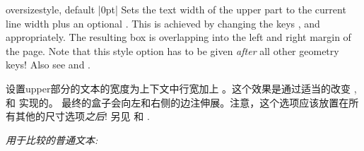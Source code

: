 \begin{docTcbKey}{oversize}{}{style, default |0pt|}
Sets the text width of the upper part to the current line width plus an
optional .
This is achieved by changing the keys 
, and
 appropriately.
The resulting box is overlapping into the left and right margin of
the page.
Note that this style option has to be given \emph{after} all other
geometry keys!
Also see  and .

设置upper部分的文本的宽度为上下文中行宽加上 。这个效果是通过适当的改变  , 和  实现的。
最终的盒子会向左和右侧的边注伸展。注意，这个选项应该放置在所有其他的尺寸选项\emph{之后}!
另见  和 .
\begin{dispListing}

\textit{用于比较的普通文本:}\\
\lipsum[2]

\begin{tcolorbox}[oversize,title=Oversized box]
\lipsum[2]
\end{tcolorbox}

\begin{tcolorbox}[title=Normal box]
\lipsum[2]
\end{tcolorbox}
\end{dispListing}
\end{docTcbKey}

{\tcbusetemp}




  
